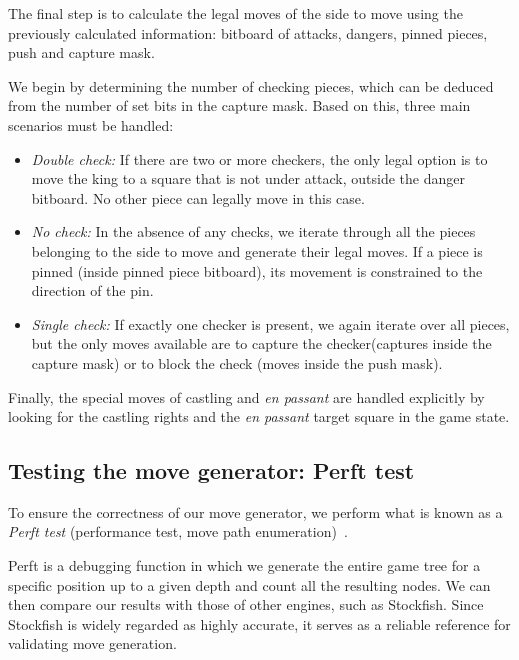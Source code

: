 \noindent The final step is to calculate the legal moves of the side to move using the previously calculated information: bitboard of attacks, dangers, pinned pieces, push and capture mask.

\vspace{1em}

\noindent We begin by determining the number of checking pieces, which can be deduced from the number of set bits in the capture mask. Based on this, three main scenarios must be handled:

\begin{itemize}
    \item \textit{Double check:} If there are two or more checkers, the only legal option is to move the king to a square that is not under attack, outside the danger bitboard. No other piece can legally move in this case.
    \item \textit{No check:} In the absence of any checks, we iterate through all the pieces belonging to the side to move and generate their legal moves. If a piece is pinned (inside pinned piece bitboard), its movement is constrained to the direction of the pin.
    \item \textit{Single check:} If exactly one checker is present, we again iterate over all pieces, but the only moves available are to capture the checker(captures inside the capture mask) or to block the check (moves inside the push mask).
\end{itemize}

\noindent Finally, the special moves of castling and \textit{en passant} are handled explicitly by looking for the castling rights and the \textit{en passant} target square in the game state.

\subsection{Testing the move generator: Perft test}

To ensure the correctness of our move generator, we perform what is known as a \textit{Perft test} (performance test, move path enumeration)~\cite{Perft}.

\vspace{1em}

\noindent Perft is a debugging function in which we generate the entire game tree for a specific position up to a given depth and count all the resulting nodes. We can then compare our results with those of other engines, such as Stockfish. Since Stockfish is widely regarded as highly accurate, it serves as a reliable reference for validating move generation.

